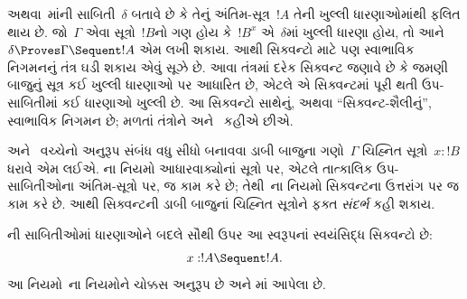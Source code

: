 \begingroup
\makeatletter{}\makeatother


\label{guunit:OLP-0669}


 અથવા~માંની
સાબિતી~$\delta$
બતાવે છે કે તેનું
અંતિમ-સૂત્ર~$!A$
તેની ખુલ્લી ધારણાઓમાંથી
ફલિત થાય છે.
જો~$\Gamma$ એવા
સૂત્રો~$!B$નો
ગણ હોય કે~$!B^x$
એ~$\delta$માં
ખુલ્લી ધારણા હોય,
તો આને
$\delta \Proves \Gamma
\Sequent !A$ એમ
લખી શકાય.
આથી સિક્વન્ટો માટે
પણ સ્વાભાવિક નિગમનનું
તંત્ર ઘડી શકાય એવું
સૂઝે છે.
આવા તંત્રમાં દરેક
સિક્વન્ટ જણાવે છે કે
જમણી બાજુનું સૂત્ર
કઈ ખુલ્લી ધારણાઓ
પર આધારિત છે,
એટલે એ સિક્વન્ટમાં
પૂરી થતી ઉપ-સાબિતીમાં
કઈ ધારણાઓ ખુલ્લી છે.
આ સિક્વન્ટો સાથેનું,
અથવા ``સિક્વન્ટ-શૈલીનું'',
સ્વાભાવિક નિગમન છે;
મળતાં તંત્રોને
 અને~
કહીએ છીએ.

 અને~
વચ્ચેનો અનુરૂપ સંબંધ
વધુ સીધો બનાવવા
ડાબી બાજુના ગણો~$\Gamma$
ચિહ્નિત
સૂત્રો~$x:!B$
ધરાવે એમ લઈએ.
ના નિયમો
આધારવાક્યોનાં
સૂત્રો પર,
એટલે તાત્કાલિક
ઉપ-સાબિતીઓના
અંતિમ-સૂત્રો પર,
જ કામ કરે છે;
તેથી~ના
નિયમો સિક્વન્ટના
ઉત્તરાંગ પર જ
કામ કરે છે.
આથી સિક્વન્ટની
ડાબી બાજુનાં
ચિહ્નિત સૂત્રોને
ફક્ત \emph{સંદર્ભ}
કહી શકાય.

ની સાબિતીઓમાં
ધારણાઓને બદલે
સૌથી ઉપર
આ સ્વરૂપનાં
સ્વયંસિદ્ધ સિક્વન્ટો છે:
\[x:!A \Sequent !A.\]
આ નિયમો~ના
નિયમોને ચોક્કસ અનુરૂપ
છે અને
માં
આપેલા છે.

\begingroup
\makeatletter{}\makeatother

\label{guunit:OLP-0667}



